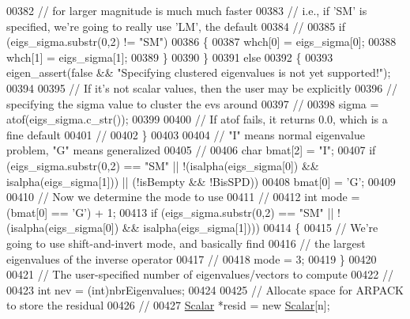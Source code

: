 \begin{DoxyCode}
00382       \textcolor{comment}{// for larger magnitude is much much faster}
00383       \textcolor{comment}{// i.e., if 'SM' is specified, we're going to really use 'LM', the default}
00384       \textcolor{comment}{//}
00385       \textcolor{keywordflow}{if} (eigs\_sigma.substr(0,2) != \textcolor{stringliteral}{"SM"})
00386       \{
00387           whch[0] = eigs\_sigma[0];
00388           whch[1] = eigs\_sigma[1];
00389       \}
00390   \}
00391   \textcolor{keywordflow}{else}
00392   \{
00393       eigen\_assert(\textcolor{keyword}{false} && \textcolor{stringliteral}{"Specifying clustered eigenvalues is not yet supported!"});
00394 
00395       \textcolor{comment}{// If it's not scalar values, then the user may be explicitly}
00396       \textcolor{comment}{// specifying the sigma value to cluster the evs around}
00397       \textcolor{comment}{//}
00398       sigma = atof(eigs\_sigma.c\_str());
00399 
00400       \textcolor{comment}{// If atof fails, it returns 0.0, which is a fine default}
00401       \textcolor{comment}{//}
00402   \}
00403 
00404   \textcolor{comment}{// "I" means normal eigenvalue problem, "G" means generalized}
00405   \textcolor{comment}{//}
00406   \textcolor{keywordtype}{char} bmat[2] = \textcolor{stringliteral}{"I"};
00407   \textcolor{keywordflow}{if} (eigs\_sigma.substr(0,2) == \textcolor{stringliteral}{"SM"} || !(isalpha(eigs\_sigma[0]) && isalpha(eigs\_sigma[1])) || (!isBempty 
      && !BisSPD))
00408       bmat[0] = \textcolor{charliteral}{'G'};
00409 
00410   \textcolor{comment}{// Now we determine the mode to use}
00411   \textcolor{comment}{//}
00412   \textcolor{keywordtype}{int} mode = (bmat[0] == \textcolor{charliteral}{'G'}) + 1;
00413   \textcolor{keywordflow}{if} (eigs\_sigma.substr(0,2) == \textcolor{stringliteral}{"SM"} || !(isalpha(eigs\_sigma[0]) && isalpha(eigs\_sigma[1])))
00414   \{
00415       \textcolor{comment}{// We're going to use shift-and-invert mode, and basically find}
00416       \textcolor{comment}{// the largest eigenvalues of the inverse operator}
00417       \textcolor{comment}{//}
00418       mode = 3;
00419   \}
00420 
00421   \textcolor{comment}{// The user-specified number of eigenvalues/vectors to compute}
00422   \textcolor{comment}{//}
00423   \textcolor{keywordtype}{int} nev = (int)nbrEigenvalues;
00424 
00425   \textcolor{comment}{// Allocate space for ARPACK to store the residual}
00426   \textcolor{comment}{//}
00427   \hyperlink{class_eigen_1_1_arpack_generalized_self_adjoint_eigen_solver_ab1182405bfe87a505d4b7a8311c661ec}{Scalar} *resid = \textcolor{keyword}{new} \hyperlink{class_eigen_1_1_arpack_generalized_self_adjoint_eigen_solver_ab1182405bfe87a505d4b7a8311c661ec}{Scalar}[n];

\end{DoxyCode}
